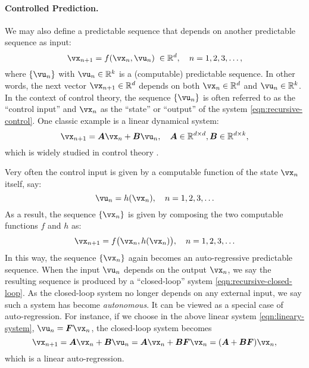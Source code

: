 \documentclass[\toplevelprefix/book-main.tex]{subfiles}
\begin{document}
\paragraph{Controlled Prediction.}
We may also define a predictable sequence that depends on another predictable sequence as input:
\begin{equation}
    \vx_{n+1} = f(\vx_{n}, \vu_n) \; \in \mathbb{R}^d, \quad n =  1, 2, 3, \ldots,
\label{eqn:recursive-control}
\end{equation}
where $\{\vu_n\}$ with $\vu_n \in \mathbb{R}^k$ is a (computable) predictable sequence. In other words, the next vector $\vx_{n+1} \in \mathbb{R}^d$ depends on both $\vx_n \in \mathbb{R}^d$ and $\vu_n \in \mathbb{R}^k$. In the context of control theory, the sequence $\{\vu_n\}$ is often referred to as the ``control input'' and  $\vx_n$ as the ``state'' or ``output'' of the system \eqref{eqn:recursive-control}. One classic example is a linear dynamical system:
\begin{equation}
    \vx_{n+1} = \boldsymbol{A}\vx_n + \boldsymbol{B}\vu_n, \quad \boldsymbol{A} \in \mathbb{R}^{d\times d}, \boldsymbol{B} \in \mathbb{R}^{d\times k},
    \label{eqn:lineary-system} 
\end{equation}
which is widely studied in control theory \cite{Cal:Des}. 

Very often the control input is given by a computable function of the state $\vx_n$ itself, say: 
\begin{equation}
    \vu_n = h(\vx_n), \quad n =  1, 2, 3, \ldots 
\end{equation}
As a result, the sequence $\{\vx_n\}$ is given by composing the two computable functions $f$ and $h$ as:
\begin{equation}
    \vx_{n+1} = f\big(\vx_{n}, h(\vx_n)\big), \quad n =  1, 2, 3, \ldots
    \label{eqn:recursive-closed-loop}
\end{equation}
In this way, the sequence $\{\vx_n\}$ again becomes an auto-regressive predictable sequence.  When the input $\vu_n$ depends on the output $\vx_n$, we say the resulting sequence is produced by a ``closed-loop'' system \eqref{eqn:recursive-closed-loop}. As the closed-loop system no longer depends on any external input, we say such a system has become {\em autonomous}. It can be viewed as a special case of auto-regression. For instance, if we choose in the above linear system \eqref{eqn:lineary-system}, $\vu_n = \boldsymbol{F}\vx_n$, the closed-loop system becomes
\begin{equation}
        \vx_{n+1} = \boldsymbol{A}\vx_n + \boldsymbol{B}\vu_n = \boldsymbol{A}\vx_n + \boldsymbol{B}\boldsymbol{F}\vx_n = (\boldsymbol{A}+ \boldsymbol{B}\boldsymbol{F})\vx_n,
    \label{eqn:lineary-system-closed}
\end{equation}
which is a linear auto-regression. 
\end{document}
